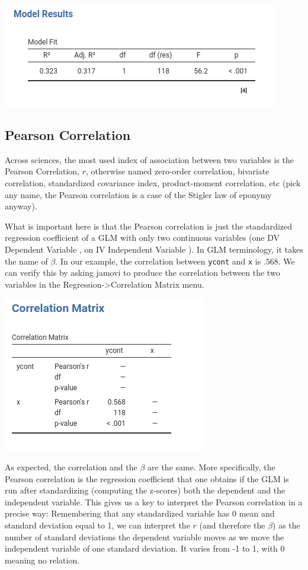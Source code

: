 \documentclass[
]{book}
\begin{document}
\includegraphics[width=0.8\linewidth]{bookletpics/2_output2}

\hypertarget{pearson-correlation}{%
\subsection{Pearson Correlation}\label{pearson-correlation}}

Across sciences, the most used index of association between two variables is the Pearson Correlation, \(r\), otherwise named zero-order correlation, bivariate correlation, standardized covariance index, product-moment correlation, etc (pick any name, the Pearson correlation is a case of the Stigler law of eponymy anyway).

What is important here is that the Pearson correlation is just the standardized regression coefficient of a GLM with only two continuous variables (one {DV {Dependent Variable} }, on {IV {Independent Variable} }). In GLM terminology, it takes the name of \(\beta\). In our example, the correlation
between \texttt{ycont} and \texttt{x} is \(.568\). We can verify this by asking {jamovi} to produce the correlation between the two variables in the {Regression-\textgreater Correlation Matrix} menu.

\includegraphics[width=0.5\linewidth]{bookletpics/2_output8}

As expected, the correlation and the \(\beta\) are the same. More specifically, the Pearson correlation is the regression coefficient that one obtains if the GLM is run after standardizing (computing the z-scores) both the dependent and the independent variable. This gives us a key to interpret the Pearson correlation in a precise way: Remembering that any standardized variable has 0 mean and standard deviation equal to 1, we can interpret the \(r\) (and therefore the \(\beta\)) as the number of standard deviations the dependent variable moves as we move the independent variable of one standard deviation. It varies from -1 to 1, with 0 meaning no relation.
\end{document}
